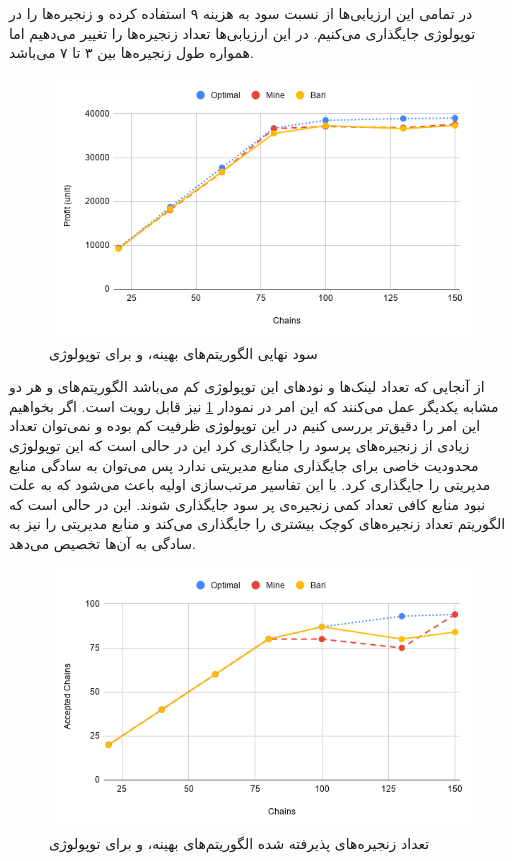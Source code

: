 در تمامی این ارزیابی‌ها از نسبت سود به هزینه ۹ استفاده کرده و
زنجیره‌ها را در توپولوژی  جایگذاری می‌کنیم.
در این ارزیابی‌ها تعداد زنجیره‌ها را تغییر می‌دهیم اما همواره طول زنجیره‌ها بین ۳ تا ۷ می‌باشد.


\begin{figure}[h!]
\center\includegraphics[scale=.5]{images/chart-6}
\caption{سود نهایی الگوریتم‌های بهینه،  و  برای توپولوژی }
\label{fig.11}
\end{figure}

از آنجایی که تعداد لینک‌ها و نودهای این توپولوژی کم می‌باشد الگوریتم‌های  و  هر دو مشابه یکدیگر عمل می‌کنند
که این امر در نمودار \ref{fig.11}
نیز قابل رویت است.
اگر بخواهیم این امر را دقیق‌تر بررسی کنیم در این توپولوژی ظرفیت کم بوده و نمی‌توان تعداد زیادی از زنجیره‌های پرسود
را جایگذاری کرد این در حالی است که این توپولوژی محدودیت خاصی برای جایگذاری منابع مدیریتی ندارد
پس می‌توان به سادگی منابع مدیریتی را جایگذاری کرد.
با این تفاسیر مرتب‌سازی اولیه باعث می‌شود که به علت نبود منابع کافی تعداد کمی زنجیره‌ی پر سود جایگذاری شوند.
این در حالی است که الگوریتم 
تعداد زنجیره‌های کوچک بیشتری را جایگذاری می‌کند و منابع مدیریتی را نیز به سادگی به آن‌ها تخصیص می‌دهد.


\begin{figure}[h!]
\center\includegraphics[scale=.5]{images/chart-7}
\caption{تعداد زنجیره‌های پذیرفته شده الگوریتم‌های بهینه،  و  برای توپولوژی }
\label{fig.12}
\end{figure}

